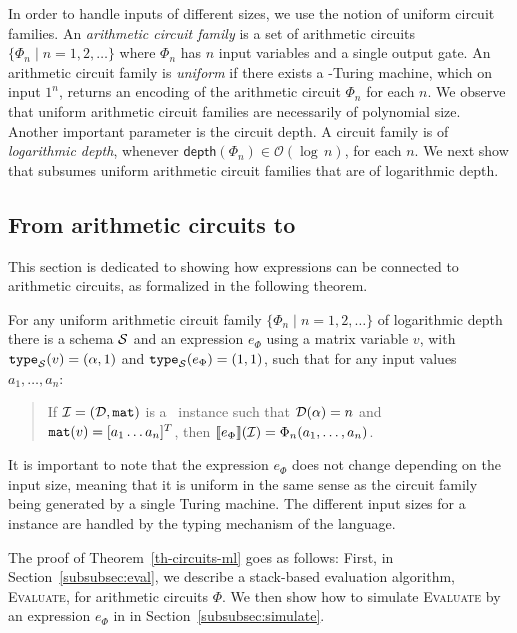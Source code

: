 In order to handle inputs of different sizes, we use the notion of uniform circuit families. An \textit{arithmetic circuit family} is a set of arithmetic circuits $\{\Phi_n\mid n=1,2,\ldots\}$ where $\Phi_n$ has $n$ input variables and a single output gate. An arithmetic circuit family is \textit{uniform} if there exists a \logspace-Turing machine,
which on input $1^n$, returns an encoding of the arithmetic circuit $\Phi_n$ for each $n$.
We observe that uniform arithmetic circuit families are necessarily of polynomial size. 
Another important parameter is the circuit depth. A circuit family is of \textit{logarithmic depth}, whenever $\mathsf{depth}(\Phi_n)\in \mathcal{O}(\log\, n)$, for each $n$. We next show that \langfor subsumes uniform arithmetic circuit families that are of logarithmic depth. 


\subsection{From arithmetic circuits to \langfor}\label{subsec:actoformatlang}
This section is dedicated to showing how \langfor expressions can be connected to arithmetic circuits, as formalized
in the following theorem.

\begin{theorem}
\label{th-circuits-ml}
For any uniform arithmetic circuit family $\{\Phi_n\mid n=1,2,\ldots\}$ of logarithmic depth there is a \langfor schema $\mathcal{S}$ and an expression $e_\Phi$ using a matrix variable $v$, with $\texttt{type}_{\mathcal{S}}(v)=(\alpha,1)$ and $\texttt{type}_{\mathcal{S}}(e_\Phi) = (1,1)$, such that for any input values $a_1,\ldots ,a_n$: 
\begin{quote} If $\mathcal{I} = (\mathcal{D},\texttt{mat})$ is a \lang\ instance such that $\mathcal{D}(\alpha) = n$ and $\texttt{mat}(v) = [a_1 \ldots a_n]^T$,
 then $\llbracket e_\Phi \rrbracket(\mathcal{I}) = \Phi_n(a_1,\ldots ,a_n)$.
\end{quote}
\end{theorem}
It is important to note that the expression $e_\Phi$ does not change depending on the input size, meaning that it is uniform in the same sense as the circuit family being generated by a single Turing machine. The different input sizes for a \langfor instance are handled by the typing mechanism of the language. 

The proof of Theorem~\ref{th-circuits-ml} goes as follows: First, in
Section~\ref{subsubsec:eval}, we describe a stack-based evaluation algorithm, \textsc{Evaluate}, for arithmetic circuits $\Phi$. We then show how to simulate  \textsc{Evaluate} by an expression $e_\Phi$ in \langfor in Section~\ref{subsubsec:simulate}. 

